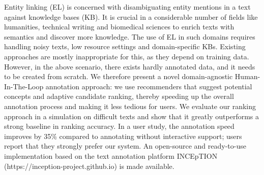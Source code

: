 Entity linking (EL) is concerned with disambiguating entity mentions in a text against knowledge bases (KB). It is crucial in a considerable number of fields like humanities, technical writing and biomedical sciences to enrich texts with semantics and discover more knowledge. The use of EL in such domains requires handling noisy texts, low resource settings and domain-specific KBs. Existing approaches are mostly inappropriate for this, as they depend on training data. However, in the above scenario, there exists hardly annotated data, and it needs to be created from scratch. We therefore present a novel domain-agnostic Human-In-The-Loop annotation approach: we use recommenders that suggest potential concepts and adaptive candidate ranking, thereby speeding up the overall annotation process and making it less tedious for users. We evaluate our ranking approach in a simulation on difficult texts and show that it greatly outperforms a strong baseline in ranking accuracy. In a user study, the annotation speed improves by 35\% compared to annotating without interactive support; users report that they strongly prefer our system. An open-source and ready-to-use implementation based on the text annotation platform INCEpTION (https://inception-project.github.io) is made available.
